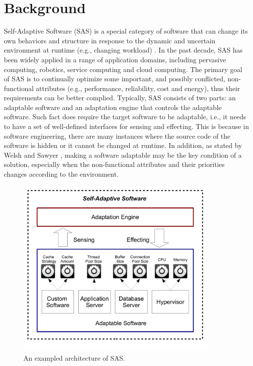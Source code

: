 \documentclass[DIV15,a4paper]{scrartcl}
\begin{document}

\section{Background}
Self-Adaptive Software (SAS) is a special category of software that can change its own behaviors and structure in response to the dynamic and uncertain environment at runtime (e.g., changing workload) \cite{Lemos2013}. In the past decade, SAS has been widely applied in a range of application domains, including pervasive computing, robotics, service computing and cloud computing. The primary goal of SAS is to continually optimize some important, and possibly conflicted, non-functional attributes (e.g., performance, reliability, cost and energy),  thus their requirements can be better complied. Typically, SAS consists of two parts: an adaptable software and an adaptation engine that controls the adaptable software. Such fact does require the target software to be adaptable, i.e., it needs to have a set of well-defined interfaces for sensing and effecting. This is because in software engineering, there are many instances where the source code of the software is hidden or it cannot be changed at runtime. In addition, as stated by Welsh and Sawyer \cite{Welsh2008}, making a software adaptable may be the key condition of a solution, especially when the non-functional attributes and their priorities changes according to the environment.


\begin{figure}[h]
\centering
\includegraphics[width=10cm]{example.pdf}
\caption{An exampled architecture of SAS.}
\label{fig:arch}
\end{figure}
\end{document}
